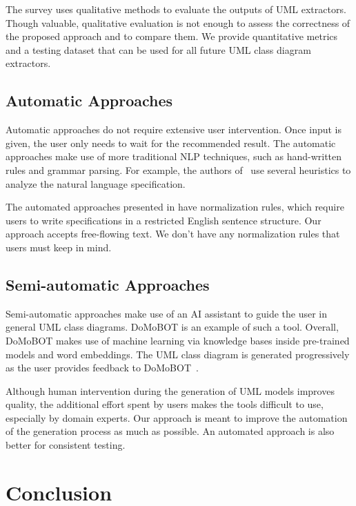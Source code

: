 \documentclass[sigconf]{acmart}
\begin{document}
The survey uses qualitative methods to evaluate the outputs of UML extractors. Though valuable, qualitative evaluation is not enough to assess the correctness of the proposed approach and to compare them. We provide quantitative metrics and a testing dataset that can be used for all future UML class diagram extractors.

\subsection{Automatic Approaches}
Automatic approaches do not require extensive user intervention. Once input is given, the user only needs to wait for the recommended result. The automatic approaches make use of more traditional NLP techniques, such as hand-written rules and grammar parsing. For example, the authors of~\cite{Abdelnabi:2020generating, More:2012} use several heuristics to analyze the natural language specification.

The automated approaches presented in \cite{Abdelnabi:2020generating, More:2012} have normalization rules, which require users to write specifications in a restricted English sentence structure. Our approach accepts free-flowing text. We don't have any normalization rules that users must keep in mind.

\subsection{Semi-automatic Approaches}
Semi-automatic approaches make use of an AI assistant to guide the user in general UML class diagrams. DoMoBOT is an example of such a tool. 
Overall, DoMoBOT makes use of machine learning via knowledge bases inside pre-trained models and word embeddings. The UML class diagram is generated progressively as the user provides feedback to DoMoBOT~\cite{Saini:2022}.

Although human intervention during the generation of UML models improves quality, the additional effort spent by users makes the tools difficult to use, especially by domain experts. Our approach is meant to improve the automation of the generation process as much as possible. An automated approach is also better for consistent testing.





\section{Conclusion}
\label{sec:conclusion}
\end{document}
